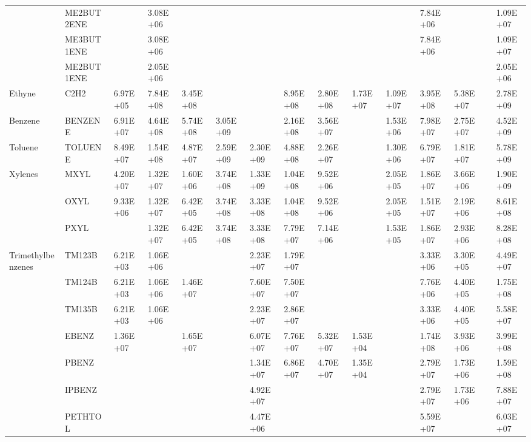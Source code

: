 \begin{longtable}{lllllllllllllll}
	 & ME2BUT2ENE &  & 3.08E+06 &  &  &  &  &  &  &  & 7.84E+06 &  &  & 1.09E+07 \\
	 & ME3BUT1ENE &  & 3.08E+06 &  &  &  &  &  &  &  & 7.84E+06 &  &  & 1.09E+07 \\
	 & ME2BUT1ENE &  & 2.05E+06 &  &  &  &  &  &  &  &  &  &  & 2.05E+06 \\
	\hline Ethyne & C2H2 & 6.97E+05 & 7.84E+08 & 3.45E+08 &  &  & 8.95E+08 & 2.80E+08 & 1.73E+07 & 1.09E+07 & 3.95E+08 & 5.38E+07 &  & 2.78E+09 \\ \hline
	Benzene & BENZENE & 6.91E+07 & 4.64E+08 & 5.74E+08 & 3.05E+09 &  & 2.16E+08 & 3.56E+07 &  & 1.53E+06 & 7.98E+07 & 2.75E+07 &  & 4.52E+09 \\
	\hline Toluene & TOLUENE & 8.49E+07 & 1.54E+08 & 4.87E+07 & 2.59E+09 & 2.30E+09 & 4.88E+08 & 2.26E+07 &  & 1.30E+06 & 6.79E+07 & 1.81E+07 &  & 5.78E+09 \\ \hline
	\multirow{3}{*}{Xylenes} & MXYL & 4.20E+07 & 1.32E+07 & 1.60E+06 & 3.74E+08 & 1.33E+09 & 1.04E+08 & 9.52E+06 &  & 2.05E+05 & 1.86E+07 & 3.66E+06 &  & 1.90E+09 \\
	 & OXYL & 9.33E+06 & 1.32E+07 & 6.42E+05 & 3.74E+08 & 3.33E+08 & 1.04E+08 & 9.52E+06 &  & 2.05E+05 & 1.51E+07 & 2.19E+06 &  & 8.61E+08 \\
	 & PXYL &  & 1.32E+07 & 6.42E+05 & 3.74E+08 & 3.33E+08 & 7.79E+07 & 7.14E+06 &  & 1.53E+05 & 1.86E+07 & 2.93E+06 &  & 8.28E+08 \\
	\hline \multirow{3}{*}{Trimethylbenzenes} & TM123B & 6.21E+03 & 1.06E+06 &  &  & 2.23E+07 & 1.79E+07 &  &  &  & 3.33E+06 & 3.30E+05 &  & 4.49E+07 \\
	 & TM124B & 6.21E+03 & 1.06E+06 & 1.46E+07 &  & 7.60E+07 & 7.50E+07 &  &  &  & 7.76E+06 & 4.40E+05 &  & 1.75E+08 \\
	 & TM135B & 6.21E+03 & 1.06E+06 &  &  & 2.23E+07 & 2.86E+07 &  &  &  & 3.33E+06 & 4.40E+05 &  & 5.58E+07 \\
	\hline \parbox[t]{2mm}{} & EBENZ & 1.36E+07 &  & 1.65E+07 &  & 6.07E+07 & 7.76E+07 & 5.32E+07 & 1.53E+04 &  & 1.74E+08 & 3.93E+06 &  & 3.99E+08 \\
	 & PBENZ &  &  &  &  & 1.34E+07 & 6.86E+07 & 4.70E+07 & 1.35E+04 &  & 2.79E+07 & 1.73E+06 &  & 1.59E+08 \\
	 & IPBENZ &  &  &  &  & 4.92E+07 &  &  &  &  & 2.79E+07 & 1.73E+06 &  & 7.88E+07 \\
	 & PETHTOL &  &  &  &  & 4.47E+06 &  &  &  &  & 5.59E+07 &  &  & 6.03E+07 \\

\end{longtable}
